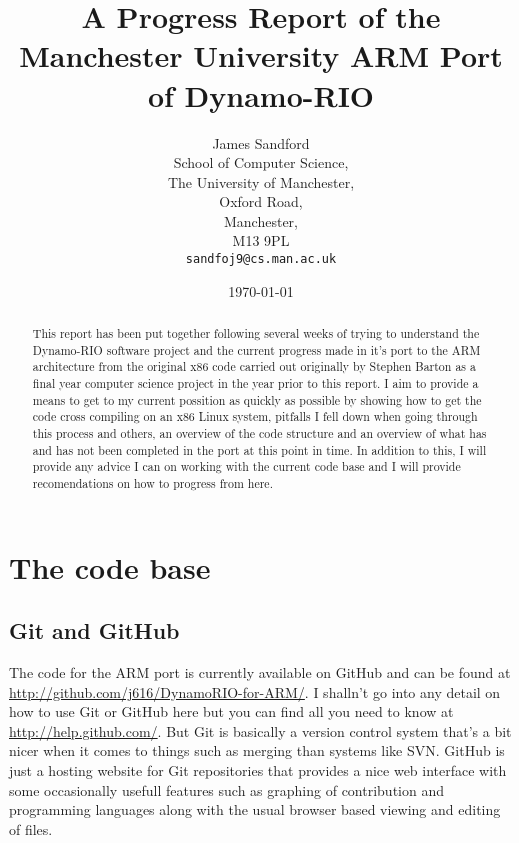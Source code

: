 \documentclass[a4paper]{article}
\title{A Progress Report of the Manchester University ARM Port of 
Dynamo-RIO}
\author{James Sandford\\
School of Computer Science,\\
The University of Manchester,\\
Oxford Road,\\
Manchester,\\
M13 9PL\\
\texttt{sandfoj9@cs.man.ac.uk}}
\date{\today}
\begin{document}
\maketitle
\newpage


\begin{abstract}
This report has been put together following several weeks of trying to
understand the Dynamo-RIO software project and the current progress made 
in it's
port to the ARM architecture from the original x86 code carried out 
originally 
by Stephen Barton as a final year computer science project in the year 
prior to 
this report. I aim to provide a means to get to my current possition as 
quickly
as possible by showing how to get the code cross compiling on an x86 
Linux
system, pitfalls I fell down when going through this process and others, 
an
overview of the code structure and an overview of what has and has not 
been
completed in the port at this point in time. In addition to this, I will 
provide
any advice I can on working with the current code base and I will 
provide
recomendations on how to progress from here.
\end{abstract}
\newpage


\tableofcontents
\newpage


\section{The code base}
\subsection{Git and GitHub}
The code for the ARM port is currently available on GitHub and can be 
found at
\url{http://github.com/j616/DynamoRIO-for-ARM/}. I shalln't go into any 
detail
on how to use Git or GitHub here but you can find all you need to know 
at
\url{http://help.github.com/}. But Git is basically a version control 
system
that's a bit nicer when it comes to things such as merging than systems 
like
SVN. GitHub is just a hosting website for Git repositories that provides 
a nice
web interface with some occasionally usefull features such as graphing 
of
contribution and programming languages along with the usual browser 
based
viewing and editing of files.
\end{document}
